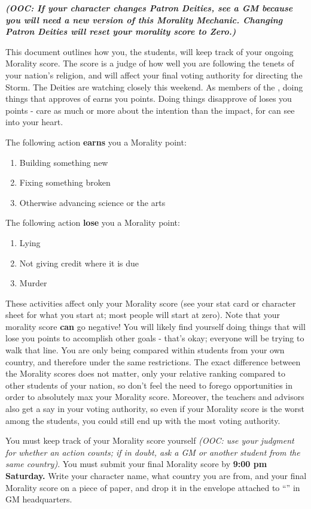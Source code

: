 \documentclass[green]{GL2020}
\begin{document}
\name{\gFPFStudentMorality{}}
\emph{\textbf{(OOC: If your character changes Patron Deities, see a GM because you will need a new version of this Morality Mechanic. Changing Patron Deities will reset your morality score to Zero.)}}

This document outlines how you, the students, will keep track of your ongoing Morality score. The score is a judge of how well you are following the tenets of your nation’s religion, and will affect your final voting authority for directing the Storm. The Deities are watching closely this weekend. As members of the \pTech{}, doing things that \cTechGod{} approves of earns you points. Doing things \cTechGod{\they} disapprove\cTechGod{\plural} of loses you points - \cTechGod{\they} care as much or more about the intention than the impact, for \cTechGod{\they} can see into your heart.

The following action \textbf{earns} you a Morality point:
\begin{enumerate}
  \item Building something new
  \item Fixing something broken
  \item Otherwise advancing science or the arts
\end{enumerate}

The following action \textbf{lose} you a Morality point:
\begin{enumerate}
  \item Lying
  \item Not giving credit where it is due
  \item Murder
\end{enumerate}

These activities affect only your Morality score (see your stat card or character sheet for what you start at; most people will start at zero).  Note that your morality score \textbf{can} go negative! You will likely find yourself doing things that will lose you points to accomplish other goals - that’s okay; everyone will be trying to walk that line. You are only being compared within students from your own country, and therefore under the same restrictions. The exact difference between the Morality scores does not matter, only your relative ranking compared to other students of your nation, so don’t feel the need to forego opportunities in order to absolutely max your Morality score. Moreover, the teachers and advisors also get a say in your voting authority, so even if your Morality score is the worst among the students, you could still end up with the most voting authority. 

You must keep track of your Morality score yourself \emph{(OOC: use your judgment for whether an action counts; if in doubt, ask a GM or another student from the same country)}. You must submit your final Morality score by \textbf{9:00 pm Saturday.} Write your character name, what country you are from, and your final Morality score on a piece of paper, and drop it in the envelope attached to “\sSignV{}” in GM headquarters. 
\end{document}
